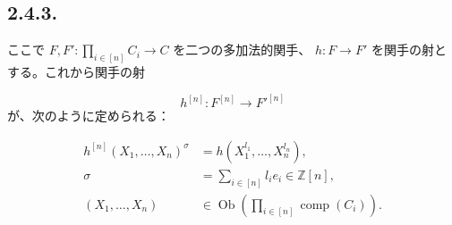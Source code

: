 \subsection*{2.4.3.}
ここで
$F,F'\colon\prod_{i\in[n]}C_i\longrightarrow C$ を二つの多加法的関手、
$h\colon F\longrightarrow F'$ を関手の射とする。これから関手の射

\begin{equation*}
  h^{[n]}\colon F^{[n]}\longrightarrow F'^{[n]}
\end{equation*}
が、次のように定められる：

\begin{equation}
  \begin{aligned}
    h^{[n]}(X_1,\ldots,X_n)^{\sigma}
      &=h(X_1^{l_1},\ldots,X_n^{l_n}),\\
    \sigma&=\sum_{i\in[n]}l_i e_i\in\mathbb Z[n],\\
    (X_1,\ldots,X_n)&\in
      \operatorname{Ob}\!\left(\prod_{i\in[n]}\operatorname{comp}(C_i)\right).
  \end{aligned}
  \tag{2.4.3.1}
\end{equation}
